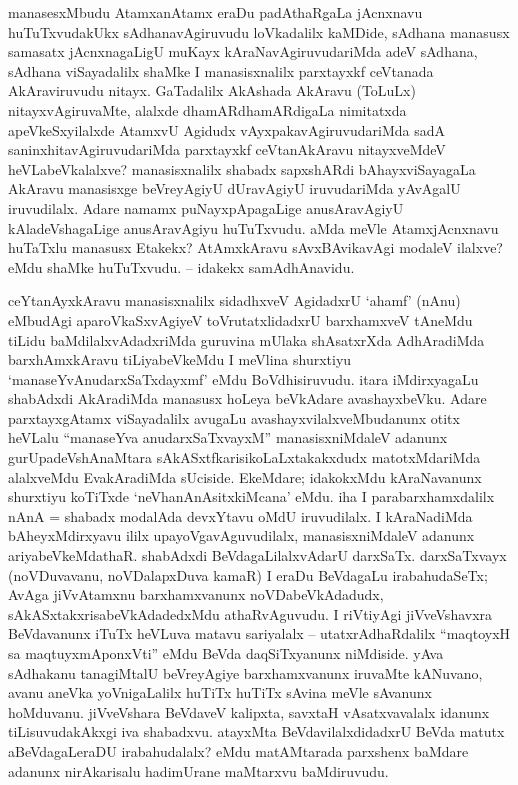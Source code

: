 \begin{artha}
manasesxMbudu AtamxanAtamx eraDu padAthaRgaLa jAcnxnavu huTuTxvudakUkx sAdhanavAgiruvudu loVkadalilx kaMDide, sAdhana manasusx samasatx jAcnxnagaLigU muKayx kAraNavAgiruvudariMda adeV sAdhana, sAdhana viSayadalilx shaMke I manasisxnalilx parxtayxkf ceVtanada AkAraviruvudu nitayx. GaTadalilx AkAshada AkAravu (ToLuLx) nitayxvAgiruvaMte, alalxde dhamARdhamARdigaLa nimitatxda apeVkeSxyilalxde AtamxvU Agidudx vAyxpakavAgiruvudariMda sadA saninxhitavAgiruvudariMda parxtayxkf ceVtanAkAravu nitayxveMdeV heVLabeVkalalxve? manasisxnalilx shabadx sapxshARdi bAhayxviSayagaLa AkAravu manasisxge beVreyAgiyU dUravAgiyU iruvudariMda yAvAgalU iruvudilalx. Adare namamx puNayxpApagaLige anusAravAgiyU kAladeVshagaLige anusAravAgiyu huTuTxvudu. aMda meVle AtamxjAcnxnavu huTaTxlu manasusx Etakekx? AtAmxkAravu sAvxBAvikavAgi modaleV ilalxve? eMdu shaMke huTuTxvudu. {\rm --} idakekx samAdhAnavidu. 

ceYtanAyxkAravu manasisxnalilx sidadhxveV AgidadxrU `ahamf' (nAnu) eMbudAgi aparoVkaSxvAgiyeV toVrutatxlidadxrU barxhamxveV tAneMdu tiLidu baMdilalxvAdadxriMda guruvina mUlaka shAsatxrXda AdhAradiMda barxhAmxkAravu tiLiyabeVkeMdu I meVlina shurxtiyu `manaseYvAnudarxSaTxdayxmf' eMdu BoVdhisiruvudu. itara iMdirxyagaLu shabAdxdi AkAradiMda manasusx hoLeya beVkAdare avashayxbeVku. Adare parxtayxgAtamx viSayadalilx avugaLu avashayxvilalxveMbudanunx otitx heVLalu ``manaseYva anudarxSaTxvayxM'' manasisxniMdaleV adanunx gurUpadeVshAnaMtara sAkASxtfkarisikoLaLxtakakxdudx matotxMdariMda alalxveMdu EvakAradiMda sUciside. EkeMdare; idakokxMdu kAraNavanunx shurxtiyu koTiTxde `neVhanAnAsitxkiMcana' eMdu. iha I parabarxhamxdalilx nAnA = shabadx modalAda devxYtavu oMdU iruvudilalx. I kAraNadiMda bAheyxMdirxyavu ililx upayoVgavAguvudilalx, manasisxniMdaleV adanunx ariyabeVkeMdathaR. shabAdxdi BeVdagaLilalxvAdarU darxSaTx. darxSaTxvayx (noVDuvavanu, noVDalapxDuva kamaR) I eraDu BeVdagaLu irabahudaSeTx; AvAga jiVvAtamxnu barxhamxvanunx noVDabeVkAdadudx, sAkASxtakxrisabeVkAdadedxMdu athaRvAguvudu. I riVtiyAgi jiVveVshavxra BeVdavanunx iTuTx heVLuva matavu sariyalalx {\rm --} utatxrAdhaRdalilx ``maqtoyxH sa maqtuyxmAponxVti'' eMdu BeVda daqSiTxyanunx niMdiside. yAva sAdhakanu tanagiMtalU beVreyAgiye barxhamxvanunx iruvaMte kANuvano, avanu aneVka yoVnigaLalilx huTiTx huTiTx sAvina meVle sAvanunx hoMduvanu. jiVveVshara BeVdaveV kalipxta, savxtaH vAsatxvavalalx idanunx tiLisuvudakAkxgi iva shabadxvu. atayxMta BeVdavilalxdidadxrU BeVda matutx aBeVdagaLeraDU irabahudalalx? eMdu matAMtarada parxshenx baMdare adanunx nirAkarisalu hadimUrane maMtarxvu baMdiruvudu.
\end{artha}

